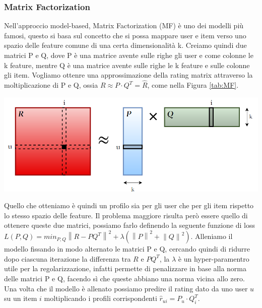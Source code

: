 \subsubsection{Matrix Factorization}
Nell'approccio model-based, Matrix Factorization (MF) è uno dei modelli più famosi, questo si basa sul concetto che si possa mappare user e item verso uno spazio delle feature comune di una certa dimensionalità k. Creiamo quindi due matrici P e Q, dove P è una matrice avente sulle righe gli user e come colonne le k feature, mentre Q è una matrice avente sulle righe le k feature e sulle colonne gli item. Vogliamo ottenre una approssimazione della rating matrix attraverso la moltiplicazione di P e Q, ossia $R \approx P \cdot Q^{T} = \hat{R}$, come nella Figura \ref{tab:MF}.\\
\begin{center}
	\includegraphics[width=14.5cm]{figures/MF_disegno}
	\label{tab:MF}
\end{center}
Quello che otteniamo è quindi un profilo sia per gli user che per gli item rispetto lo stesso spazio delle feature. Il problema maggiore risulta però essere quello di ottenere queste due matrici, possiamo farlo definendo la seguente funzione di loss $L(P,Q) = min_{P,Q} \left\lVert R - PQ^T\right\rVert^2 +\lambda(\left\lVert P \right\rVert^2 + \left\lVert Q \right\rVert^2)$. Alleniamo il modello fissando in modo alternato le matrici P e Q, cercando quindi di ridurre dopo ciascuna iterazione la differenza tra $R$ e $PQ^T$, la $\lambda$ è un hyper-paramentro utile per la regolarizzazione, infatti permette di penalizzare in base alla norma delle matrici P e Q, facendo sì che queste abbiano una norma vicina allo zero.\\
Una volta che il modello è allenato possiamo predire il rating dato da uno user $u$ su un item $i$ moltiplicando i profili corrispondenti $\hat{r}_{ui} = P_u \cdot Q_{i}^{T}$.

